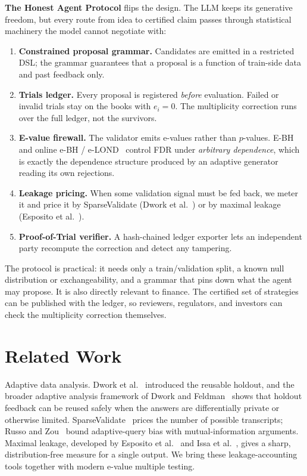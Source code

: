 \documentclass[sigconf]{acmart}
\theoremstyle{plain}
\begin{document}
\textbf{The Honest Agent Protocol} flips the design. The LLM keeps its
generative freedom, but every route from idea to certified claim passes through
statistical machinery the model cannot negotiate with:
\begin{enumerate}
\item \textbf{Constrained proposal grammar.} Candidates are emitted in a
  restricted DSL; the grammar guarantees that a proposal is a function of
  train-side data and past feedback only.
\item \textbf{Trials ledger.} Every proposal is registered \emph{before}
  evaluation. Failed or invalid trials stay on the books with $e_i=0$. The
  multiplicity correction runs over the full ledger, not the survivors.
\item \textbf{E-value firewall.} The validator emits e-values rather than
  $p$-values. E-BH~\cite{wang2022} and online e-BH / e-LOND~\cite{xu2024}
  control FDR under \emph{arbitrary dependence}, which is exactly the
  dependence structure produced by an adaptive generator reading its own
  rejections.
\item \textbf{Leakage pricing.} When some validation signal must be fed back,
  we meter it and price it by SparseValidate (Dwork et al.~\cite{dwork2015})
  or by maximal leakage (Esposito et al.~\cite{esposito2019}).
\item \textbf{Proof-of-Trial verifier.} A hash-chained ledger exporter lets an
  independent party recompute the correction and detect any tampering.
\end{enumerate}

The protocol is practical: it needs only a train/validation split, a known null
distribution or exchangeability, and a grammar that pins down what the agent
may propose. It is also directly relevant to finance. The certified set of
strategies can be published with the ledger, so reviewers, regulators, and
investors can check the multiplicity correction themselves.

\section{Related Work}\label{sec:related}

Adaptive data analysis. Dwork et al.~\cite{dwork2015} introduced the reusable
holdout, and the broader adaptive analysis framework of Dwork and
Feldman~\cite{dwork2018} shows that holdout feedback can be reused safely when
the answers are differentially private or otherwise limited.
SparseValidate~\cite{dwork2015} prices the number of possible transcripts;
Russo and Zou~\cite{russo2016} bound adaptive-query bias with
mutual-information arguments. Maximal leakage, developed by Esposito et
al.~\cite{esposito2019} and Issa et al.~\cite{issa2019}, gives a sharp,
distribution-free measure for a single output. We bring these
leakage-accounting tools together with modern e-value multiple testing.
\end{document}
